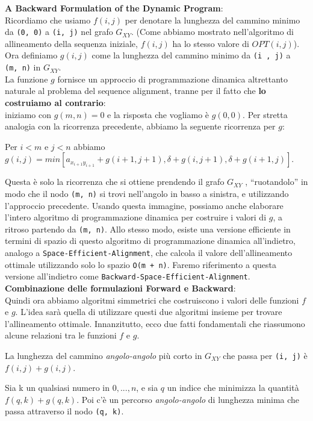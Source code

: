 \textbf{A Backward Formulation of the Dynamic Program}:\\ Ricordiamo che
usiamo $f(i, j)$ per denotare la lunghezza del cammino minimo da
\texttt{(0,\ 0)} a \texttt{(i,\ j)} nel grafo $G_{XY}$. (Come abbiamo
mostrato nell'algoritmo di allineamento della sequenza iniziale,
$f(i, j)$ ha lo stesso valore di $OPT(i, j)$).\\ Ora definiamo
$g(i, j)$ come la lunghezza del cammino minimo da \texttt{(i\ ,\ j)} a
\texttt{(m,\ n)} in $G_{XY}$.\\ La funzione $g$ fornisce un approccio
di programmazione dinamica altrettanto naturale al problema del sequence
alignment, tranne per il fatto che \textbf{lo costruiamo al contrario}:\\
iniziamo con $g(m, n) = 0$ e la risposta che vogliamo è $g(0, 0)$.
Per stretta analogia con la ricorrenza precedente, abbiamo la seguente
ricorrenza per $g$:
\begin{myblockquote} Per $i < m$ e $j < n$ abbiamo\\
  $g(i, j) = min[a_{x_{i+1} y_{i+1}} + g(i + 1, j + 1), \delta + g(i, j + 1), \delta + g (i + 1, j)]$.
\end{myblockquote}

Questa è solo la ricorrenza che si ottiene prendendo il grafo $G_{XY}$
, ``ruotandolo'' in modo che il nodo \texttt{(m,\ n)} si trovi
nell'angolo in basso a sinistra, e utilizzando l'approccio precedente.
Usando questa immagine, possiamo anche elaborare l'intero algoritmo di
programmazione dinamica per costruire i valori di $g$, a ritroso
partendo da \texttt{(m,\ n)}. Allo stesso modo, esiste una versione
efficiente in termini di spazio di questo algoritmo di programmazione
dinamica all'indietro, analogo a \texttt{Space-Efficient-Alignment}, che
calcola il valore dell'allineamento ottimale utilizzando solo lo spazio
\texttt{O(m\ +\ n)}. Faremo riferimento a questa versione all'indietro
come \texttt{Backward-Space-Efficient-Alignment}.\\

\textbf{Combinazione delle formulazioni Forward e Backward}:\\ Quindi ora
abbiamo algoritmi simmetrici che costruiscono i valori delle funzioni
$f$ e $g$. L'idea sarà quella di utilizzare questi due algoritmi
insieme per trovare l'allineamento ottimale. Innanzitutto, ecco due
fatti fondamentali che riassumono alcune relazioni tra le funzioni $f$
e $g$.
\begin{myblockquote}
  La lunghezza del cammino \emph{angolo-angolo}
  più corto in $G_{XY}$ che passa per \texttt{(i, j)} è
  $f(i, j) + g(i, j)$.
\end{myblockquote}
\begin{myblockquote}
  Sia k un qualsiasi numero in ${0, . . . , n}$, e sia $q$ un indice
  che minimizza la quantità $f(q, k) + g(q, k)$. Poi c'è un percorso
  \emph{angolo-angolo} di lunghezza minima che passa attraverso il nodo \texttt{(q, k)}.
\end{myblockquote}

